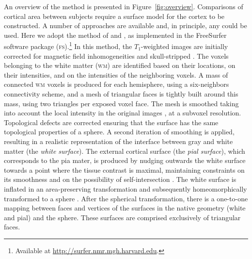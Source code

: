 An overview of the method is presented in Figure~\ref{fig:overview}. Comparisons of cortical area between subjects require a surface model for the cortex to be constructed. A number of approaches are available \citep{Mangin1995, Dale1999, vanEssen2001, Kim2005} and, in principle, any could be used. Here we adopt the method of \citet{Dale1999} and \citet{Fischl1999_cortical}, as implemented in the FreeSurfer software package (\textsc{fs}).\footnote{Available at \href{http://surfer.nmr.mgh.harvard.edu}{http://surfer.nmr.mgh.harvard.edu}.} In this method, the $T_1$-weighted images are initially corrected for magnetic field inhomogeneities and skull-stripped \citep{Segonne2004}. The voxels belonging to the white matter (\textsc{wm}) are identified based on their locations, on their intensities, and on the intensities of the neighboring voxels. A mass of connected \textsc{wm} voxels is produced for each hemisphere, using a six-neighbors connectivity scheme, and a mesh of triangular faces is tightly built around this mass, using two triangles per exposed voxel face. The mesh is smoothed taking into account the local intensity in the original images \citep{Dale1993}, at a subvoxel resolution. Topological defects are corrected \citep{Fischl2001,Segonne2007} ensuring that the surface has the same topological properties of a sphere. A second iteration of smoothing is applied, resulting in a realistic representation of the interface between gray and white matter (the \emph{white surface}). The external cortical surface (the \emph{pial surface}), which corresponds to the pia mater, is produced by nudging outwards the white surface towards a point where the tissue contrast is maximal, maintaining constraints on its smoothness and on the possibility of self-intersection \citep{Fischl2000}. The white surface is inflated in an area-preserving transformation and subsequently homeomorphically transformed to a sphere \citep{Fischl1999_intersubject}. After the spherical transformation, there is a one-to-one mapping between faces and vertices of the surfaces in the native geometry (white and pial) and the sphere. These surfaces are comprised exclusively of triangular faces.

